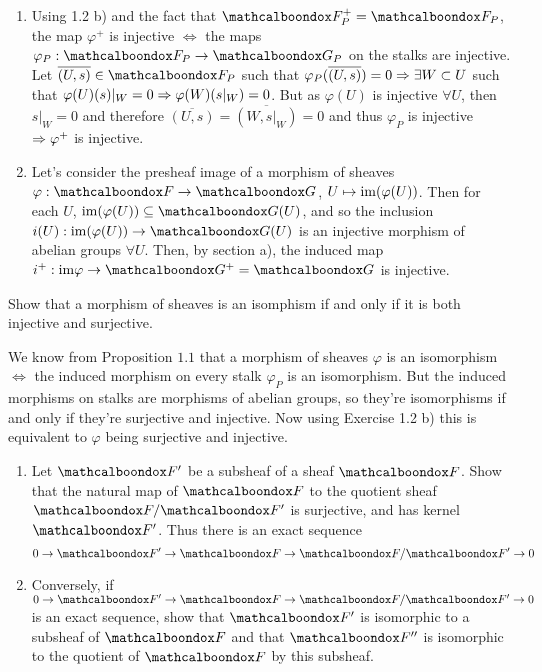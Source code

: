 \begin{sol}
	\begin{enumerate}[label=\alph*)]
		\item Using 1.2 b) and the fact that $\sF^{+}_P = \sF_P$, the map $\varphi^{+}$ is injective $\iff$ the maps $\varphi_P: \sF_P \to \sG_P$ on the stalks are injective. Let $\overline{(U,s)} \in \sF_P$ such that $\varphi_P(\overline{(U,s)}) = 0 \Rightarrow \exists W \subset U$ such that $\varphi(U)(s)|_W = 0 \Rightarrow \varphi(W)(s|_W) = 0$. But as $\varphi(U)$ is injective $\forall U$, then $s|_W = 0$ and therefore $\overline{(U,s)} = \overline{(W,s|_W)} = 0$ and thus $\varphi_P$ is injective $\Rightarrow \varphi^{+}$ is injective.

		\item Let's consider the presheaf image of a morphism of sheaves $\varphi: \sF \to \sG$, $U \mapsto \mathrm{im} (\varphi(U))$. Then for each $U$, $\ima (\varphi(U)) \subseteq \sG(U)$, and so the inclusion $i(U): \ima (\varphi(U)) \to \sG(U)$ is an injective morphism of abelian groups $\forall U$. Then, by section a), the induced map $i^{+}: \ima \varphi \to \sG^{+} = \sG$ is injective. 
	\end{enumerate}
\end{sol}

\begin{ex}
	Show that a morphism of sheaves is an isomphism if and only if it is both injective and surjective.
\end{ex}

\begin{sol}
	We know from Proposition $1.1$ that a morphism of sheaves $\varphi$ is an isomorphism $\iff$ the induced morphism on every stalk $\varphi_P$ is an isomorphism. But the induced morphisms on stalks are morphisms of abelian groups, so they're isomorphisms if and only if they're surjective and injective. Now using Exercise 1.2 b) this is equivalent to $\varphi$ being surjective and injective.
\end{sol}

\begin{ex}
	\begin{enumerate}[label=\alph*)]
		\item Let $\sF'$ be a subsheaf of a sheaf $\sF$. Show that the natural map of $\sF$ to the quotient sheaf $\sF / \sF'$ is surjective, and has kernel $\sF'$. Thus there is an exact sequence
		\[
			0 \to \sF' \to \sF \to \sF / \sF' \to 0
		\]

		\item Conversely, if $0 \to \sF' \to \sF \to \sF / \sF' \to 0$ is an exact sequence, show that $\sF'$ is isomorphic to a subsheaf of $\sF$ and that $\sF''$ is isomorphic to the quotient of $\sF$ by this subsheaf.
	\end{enumerate}
\end{ex}


